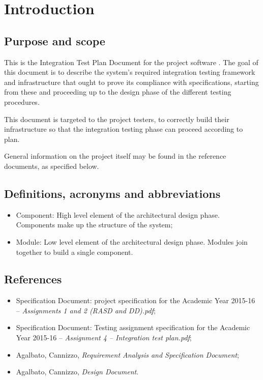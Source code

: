 \chapter{Introduction}

\section{Purpose and scope}
This is the Integration Test Plan Document for the project software \mts{}. The goal of this document is to describe the system's required integration testing framework and infrastructure that ought to prove its compliance with specifications, starting from these and proceeding up to the design phase of the different testing procedures.

This document is targeted to the project testers, to correctly build their infrastructure so that the integration testing phase can proceed according to plan.

General information on the \mts{} project itself may be found in the reference documents, as specified below.

\section{Definitions, acronyms and abbreviations}
\begin{itemize}
\item Component: High level element of the architectural design phase. Components make up the structure of the system;
\item Module: Low level element of the architectural design phase. Modules join together to build a single component.
\end{itemize}

\section{References}
\begin{itemize}
\item Specification Document: \mts{} project specification for the Academic Year 2015-16 -- \emph{Assignments 1 and 2 (RASD and DD).pdf};
\item Specification Document: Testing assignment specification for the Academic Year 2015-16 -- \emph{Assignment 4 -- Integration test plan.pdf};
\item Agalbato, Cannizzo, \emph{Requirement Analysis and Specification Document};
\item Agalbato, Cannizzo, \emph{Design Document}.
\end{itemize}